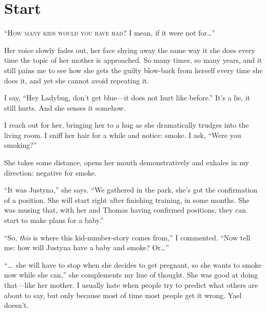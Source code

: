 \chapter*{Start}\label{start}

\enquote{\noindent\textsc{{How many kids would you have had?}} I mean, if it were not for\dots{}}

Her voice slowly fades out, her face shying away the same way it she does every time the topic of her mother is approached. So many times, so many years, and it still pains me to see how she gets the guilty blow-back from herself every time she does it, and yet she cannot avoid repeating it.

I say, \enquote{Hey Ladybug, don't get blue---it does not hurt like before.} It's a lie, it still hurts. And she senses it somehow.

I reach out for her, bringing her to a hug as she dramatically trudges into the living room. I sniff her hair for a while and notice: smoke. I ask, \enquote{Were you smoking?}

She takes some distance, opens her mouth demonstratively and exhales in my direction: negative for smoke. 

\enquote{It was Justyna,} she says. \enquote{We gathered in the park, she's got the confirmation of a position. She will start right after finishing training, in some months. She was musing that, with her and Thomas having confirmed positions, they can start to make plans for a baby.}

\enquote{So, \emph{this} is where this kid-number-story comes from,} I commented. \enquote{Now tell me: how will Justyna have a baby and smoke? Or\dots{}}

\enquote{\dots~she will have to stop when she decides to get pregnant, so she wants to smoke now while she can,} she complements my line of thought. She was good at doing that---like her mother. I usually hate when people try to predict what others are about to say, but only because most of time most people get it wrong. Yael doesn't. 